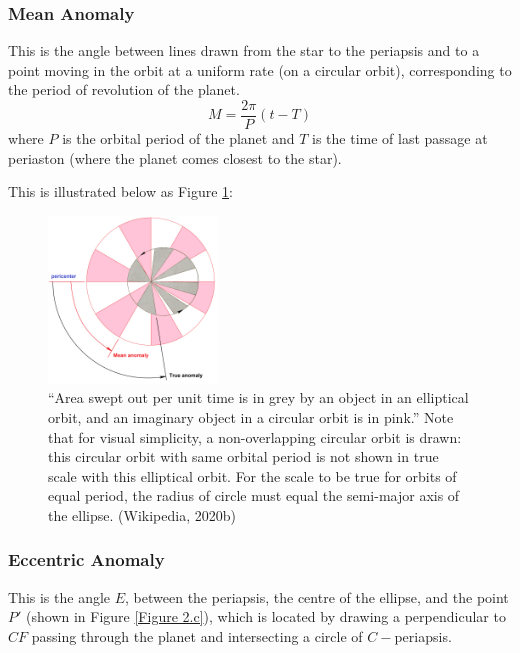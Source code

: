 \documentclass[11pt]{article}
\begin{document}
\hypertarget{mean-anomaly}{%
\subsubsection{Mean Anomaly}\label{mean-anomaly}}

This is the angle between lines drawn from the star to the periapsis and
to a point moving in the orbit at a uniform rate (on a circular orbit),
corresponding to the period of revolution of the planet.
\begin{equation*}
M = \frac{2\pi}{P}(t-T) 
\end{equation*} where \(P\) is the orbital period of the planet and
\(T\) is the time of last passage at periaston (where the planet comes
closest to the star).

This is illustrated below as Figure \ref{Figure 2.b}:

\begin{figure}[!ht]
	\centering
	\includegraphics[width=0.4\textwidth]{../images/Mean_anomaly_diagram.png}
	\caption{``Area swept out per unit time is in grey by an object in an elliptical orbit, and an imaginary object in a circular orbit is in pink.'' Note that for visual simplicity, a non-overlapping circular orbit is drawn: this circular orbit with same orbital period is not shown in true scale with this elliptical orbit. For the scale to be true for orbits of equal period, the radius of circle must equal the semi-major axis of the ellipse. (Wikipedia, 2020b)} 
	
	\label{Figure 2.b}
\end{figure}

    \hypertarget{eccentric-anomaly}{%
\subsubsection{Eccentric Anomaly}\label{eccentric-anomaly}}

This is the angle \(E\), between the periapsis, the centre of the
ellipse, and the point $P'$ (shown in Figure \ref{Figure 2.c}), which is located by
drawing a perpendicular to \(CF\) passing through the planet and
intersecting a circle of \(C-\)periapsis.
\end{document}
